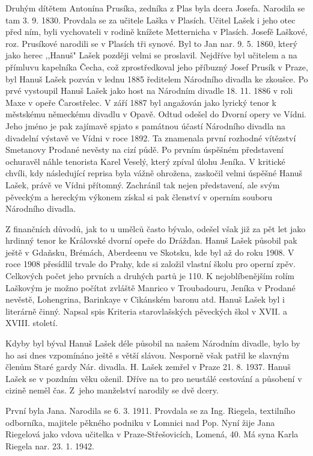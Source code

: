 \documentclass[../dejiny-rodu-prusiku.tex]{subfiles}
\begin{document}
Druhým dítětem Antonína Prusíka, zedníka z Plas byla dcera Josefa. Narodila se tam 3. 9. 1830. Provdala se za učitele Laška v Plasích. Učitel Lašek i jeho otec před ním, byli vychovateli v rodině knížete Metternicha v Plasích. Josefě Laškové, roz. Prusíkové narodili se v Plasích tři synové. Byl to Jan nar. 9. 5. 1860, který jako herec ,,Hanuš" Lašek později velmi se proslavil. Nejdříve byl učitelem a na přímluvu kapelníka Čecha, což zprostředkoval jeho příbuzný Josef Prusík v Praze, byl Hanuš Lašek pozván v lednu 1885 ředitelem Národ­ního divadla ke zkoušce. Po prvé vystoupil Hanuš Lašek jako host na Národním divadle 18. 11. 1886 v roli Maxe v opeře Čarostřelec. V září 1887 byl angažován jako lyrický tenor k městskému německému divadlu v Opavě. Odtud odešel do Dvorní opery ve Vídni. Jeho jméno je pak zajímavě spjato s památnou účastí Národního divad­la na divadelní výstavě ve Vídni v roce 1892. Ta znamenala první rozhodné vítězství Smetanovy Prodané ne­věsty na cizí půdě. Po prvním úspěšném představení ochuravěl náhle tenorista Karel Veselý, který zpíval úlohu Jeníka. V kritické chvíli, kdy následující reprisa byla vážně ohrožena, zaskočil velmi úspěšné Hanuš Lašek, právě ve Vídni přítomný. Zachránil tak nejen představení, ale svým pěveckým a hereckým výkonem získal si pak členství v operním souboru Národního divadla.

Z finančních důvodů, jak to u umělců často bývalo, odešel však již za pět let jako hrdinný tenor ke Královské dvorní opeře do Drážďan. Hanuš Lašek působil pak ještě v Gdaňsku, Brémách, Aberdeenu ve Skotsku, kde byl až do roku 1908. V roce 1908 přesídlil trvale do Prahy, kde si založil vlastní školu pro operní zpěv. Celkových počet jeho prvních a druhých partů je 110. K nejoblíbenějším rolím Laškovým je možno počítat zvláště Manrico v Troubadouru, Jeníka v Prodané nevěstě, Lohengrina, Barinkaye v Cikánském baronu atd. Hanuš Lašek byl i literárně činný. Napsal spis Kriteria starovlašských pěveckých škol v XVII. a XVIII. století.

Kdyby byl býval Hanuš Lašek déle působil na našem Národním divadle, bylo by ho asi dnes vzpomínáno ještě s větší slávou. Nesporně však patřil ke slavným členům Staré gardy Nár. divadla. H. Lašek zemřel v Praze 21. 8. 1937. Hanuš Lašek se v pozdním věku oženil. Dříve na to pro neustálé cestování a působení v cizině neměl čas. Z jeho manželství narodily se dvě dcery.

První byla Jana. Narodila se 6. 3. 1911. Provdala se za Ing. Riegela, textilního odborníka, majitele pěkného podniku v Lomnici nad Pop. Nyní žije Jana Riegelová jako vdova učitelka v Praze-Střešovicích, Lomená, 40. Má syna Karla Riegela nar. 23. 1. 1942.
\end{document}
